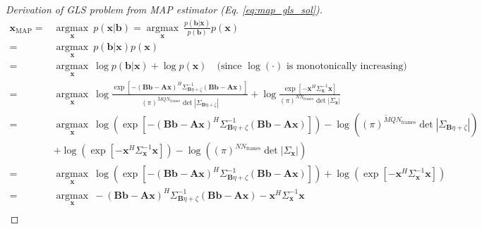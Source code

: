 \documentclass[11pt]{article}
\begin{document}
\begin{proof}[Derivation of GLS problem from MAP estimator (Eq. \ref{eq:map_gls_sol})]
    \begin{equation*}
        \begin{aligned}
            \mathbf{x}_\mathrm{MAP} = & \underset{\mathbf{x}}{\operatorname{argmax}}\ p(\mathbf{x} | \mathbf{b})
            = \underset{\mathbf{x}}{\operatorname{argmax}}\ \frac{p(\mathbf{b} | \mathbf{x})}{p(\mathbf{b})}p(\mathbf{x}) \\
            = & \underset{\mathbf{x}}{\operatorname{argmax}}\ p(\mathbf{b} | \mathbf{x}) p(\mathbf{x}) \\
            = &\underset{\mathbf{x}}{\operatorname{argmax}}\ \log p(\mathbf{b} | \mathbf{x})
            + \log p(\mathbf{x}) \quad \text{(since $\log(
            \cdot)$ is monotonically increasing)} \\
            = & \underset{\mathbf{x}}{\operatorname{argmax}}\
            \log \frac{\exp\left[ - (\mathbf{Bb} - \mathbf{A}\mathbf{x})^H\Sigma_{\mathbf{B}\eta + \zeta}^{-1}(\mathbf{Bb} - \mathbf{A}\mathbf{x})\right]}{(\pi)^{\tilde{M}QN_\mathrm{frames}} \det{ |\Sigma_{\mathbf{B}\eta + \zeta} |}}
            + \log \frac{\exp\left[ - \mathbf{x}^H\Sigma_{\mathbf{x}}^{-1}\mathbf{x} \right]}{(\pi)^{NN_\mathrm{frames}} \det{ |\Sigma_{\mathbf{x}} |}} \\
            = & \underset{\mathbf{x}}{\operatorname{argmax}}\
            \log \left( \exp\left[ - (\mathbf{Bb} - \mathbf{A}\mathbf{x})^H\Sigma_{\mathbf{B}\eta + \zeta}^{-1}(\mathbf{Bb} - \mathbf{A}\mathbf{x})\right] \right) - \log \left( (\pi)^{\tilde{M}QN_\mathrm{frames}} \det{ |\Sigma_{\mathbf{B}\eta + \zeta} |} \right) \\
            & + \log \left(\exp\left[ - \mathbf{x}^H\Sigma_{\mathbf{x}}^{-1}\mathbf{x} \right]\right) - \log \left((\pi)^{NN_\mathrm{frames}} \det{ |\Sigma_{\mathbf{x}} |}\right) \\
            = & \underset{\mathbf{x}}{\operatorname{argmax}}\
            \log \left( \exp\left[ - (\mathbf{Bb} - \mathbf{A}\mathbf{x})^H\Sigma_{\mathbf{B}\eta + \zeta}^{-1}(\mathbf{Bb} - \mathbf{A}\mathbf{x})\right] \right)
            + \log \left(\exp\left[ - \mathbf{x}^H\Sigma_{\mathbf{x}}^{-1}\mathbf{x} \right]\right)\\
            = & \underset{\mathbf{x}}{\operatorname{argmax}}\
            - (\mathbf{Bb} - \mathbf{A}\mathbf{x})^H\Sigma_{\mathbf{B}\eta + \zeta}^{-1}(\mathbf{Bb} - \mathbf{A}\mathbf{x})
            - \mathbf{x}^H\Sigma_{\mathbf{x}}^{-1}\mathbf{x}\\

\end{aligned}
\end{equation*}
\end{proof}
\end{document}
